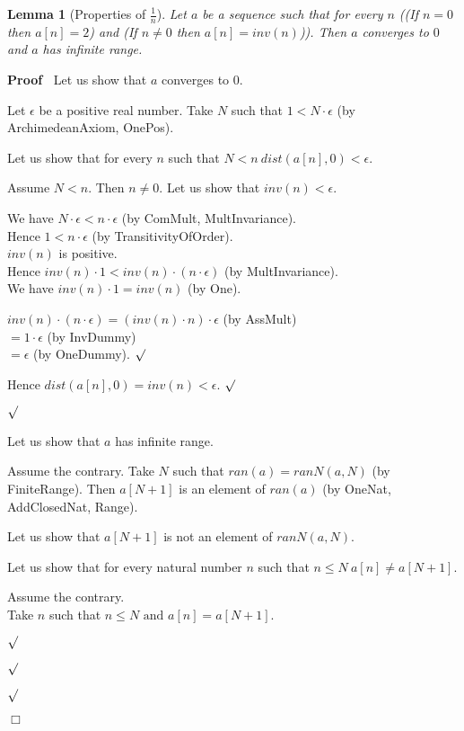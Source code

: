 \documentclass{article}
\newenvironment{forthel}{\begin{leftbar}}{\end{leftbar}}
\newenvironment{proof}{\noindent\textbf{Proof\ }}{\hspace*{\fill}$\Box$\medskip}
\newenvironment{subproof}{\begin{list}{}{}
		\item[\text{Proof}]}{\hfill $\surd$ \end{list}}
\newtheorem{lemma}{Lemma}
\newcommand{\dotequal}{=}
\begin{document}
\begin{forthel}
	\begin{lemma}[Properties of $\frac{1}{n}$]
		Let $a$ be a sequence such that for every $n$
		((If $n = 0$ then $a[n] = 2$) and (If $n \neq 0$ then $a[n] = inv(n)$)).
		Then $a$ converges to $0$ and $a$ has infinite range.
	\end{lemma}
	\begin{proof}
		Let us show that $a$ converges to $0$.
		\begin{subproof}
			Let $\epsilon$ be a positive real number. 
			Take $N$ such that $1 < N \cdot \epsilon$ (by ArchimedeanAxiom, OnePos).
	
			Let us show that for every $n$ such that $N < n \ dist(a[n],0) < \epsilon$.
			\begin{subproof}
				Assume $N < n$. Then $n \neq 0$.
				Let us show that $inv(n) < \epsilon$.
				\begin{subproof}
					We have $N \cdot \epsilon < n \cdot \epsilon$ (by ComMult, MultInvariance).\\
					Hence $1 < n \cdot \epsilon$ (by TransitivityOfOrder).\\
					$inv(n)$ is positive.\\
					Hence $inv(n) \cdot 1 < inv(n) \cdot (n \cdot \epsilon)$ (by MultInvariance).\\
					We have $inv(n) \cdot 1 = inv(n)$ (by One).
				
					$inv(n) \cdot (n \cdot \epsilon) \dotequal (inv(n) \cdot n) \cdot \epsilon$ (by AssMult)\\
					$\dotequal 1 \cdot \epsilon$ (by InvDummy)\\
					$\dotequal \epsilon$ (by OneDummy).
				\end{subproof}
				Hence $dist(a[n],0) = inv(n) < \epsilon$.
			\end{subproof}
		\end{subproof}
		Let us show that $a$ has infinite range.
		\begin{subproof}
			Assume the contrary.
			Take $N$ such that $ran(a) = ranN(a,N)$ (by FiniteRange).
			Then $a[N + 1]$ is an element of $ran(a)$ (by OneNat, AddClosedNat, Range).
			
			Let us show that $a[N + 1]$ is not an element of $ranN(a,N)$.
			\begin{subproof}
				Let us show that for every natural number $n$ such that $n \leq N \ a[n] \neq a[N + 1]$.
				\begin{subproof}
					Assume the contrary.\\
					Take $n$ such that $n \leq N \text{ and } a[n] = a[N + 1]$.
					

\end{subproof}
\end{subproof}
\end{subproof}
\end{proof}
\end{forthel}
\end{document}
